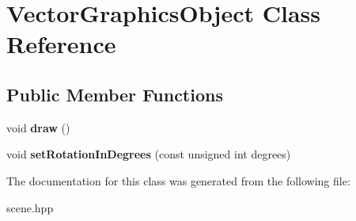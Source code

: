 \hypertarget{class_vector_graphics_object}{}\section{Vector\+Graphics\+Object Class Reference}
\label{class_vector_graphics_object}
\subsection*{Public Member Functions}
\begin{DoxyCompactItemize}
\item 
\mbox{\label{class_vector_graphics_object_a033a9ec046b5a77f478926ce210f9e99}} 
void {\bfseries draw} ()
\item 
\mbox{\label{class_vector_graphics_object_af86c080d8c81da38ea7c91f13211bab9}} 
void {\bfseries set\+Rotation\+In\+Degrees} (const unsigned int degrees)
\end{DoxyCompactItemize}


The documentation for this class was generated from the following file\+:\begin{DoxyCompactItemize}
\item 
scene.\+hpp\end{DoxyCompactItemize}
